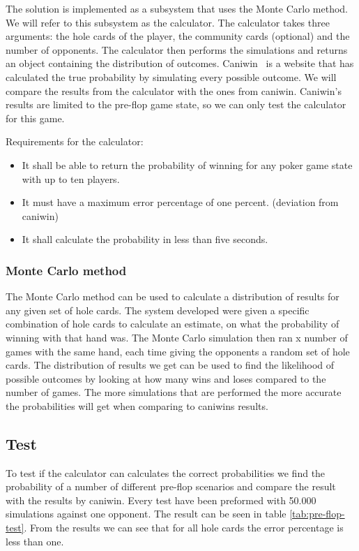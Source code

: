 The solution is implemented as a subsystem that uses the Monte Carlo method. We will refer to this subsystem as the calculator. The calculator takes three arguments: the hole cards of the player, the community cards (optional) and the number of opponents. The calculator then performs the simulations and returns an object containing the distribution of outcomes.
Caniwin~\cite{caniwin} is a website that has calculated the true probability by simulating every possible outcome. We will compare the results from the calculator with the ones from caniwin. Caniwin's results are limited to the pre-flop game state, so we can only test the calculator for this game.

Requirements for the calculator:
\begin{itemize}
\item It shall be able to return the probability of winning for any poker game state with up to ten players.
\item It must have a maximum error percentage of one percent. (deviation from caniwin)
\item It shall calculate the probability in less than five seconds.
\end{itemize}


\subsubsection{Monte Carlo method}
The Monte Carlo method can be used to calculate a distribution of results for any given set of hole cards. The system developed were given a specific combination of hole cards to calculate an estimate, on what the probability of winning with that hand was. The Monte Carlo simulation then ran x number of games with the same hand, each time giving the opponents a random set of hole cards. The distribution of results we get can be used to find the likelihood of possible outcomes by looking at how many wins and loses compared to the number of games. The more simulations that are performed the more accurate the probabilities will get when comparing to caniwins results.

\subsection{Test}
To test if the calculator can calculates the correct probabilities we find the probability of a number of different pre-flop scenarios and compare the result with the results by caniwin. Every test have been preformed with 50.000 simulations against one opponent. The result can be seen in table \ref{tab:pre-flop-test}. From the results we can see that for all hole cards the error percentage is less than one.

